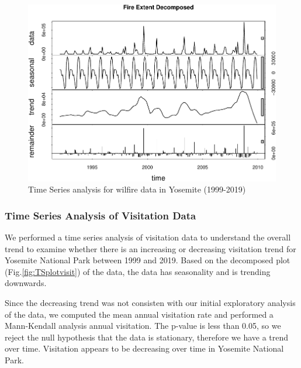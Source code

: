 \documentclass[
  12pt,
]{article}
\begin{document}
\begin{figure}
\centering
\includegraphics{CodeFinal_files/figure-latex/TSplotfire-1.pdf}
\caption{\label{fig:TSplotfire}Time Series analysis for wilfire data in Yosemite (1999-2019)}
\end{figure}

\hypertarget{time-series-analysis-of-visitation-data}{%
\subsubsection{Time Series Analysis of Visitation Data}\label{time-series-analysis-of-visitation-data}}

We performed a time series analysis of visitation data to understand the overall trend to examine whether there is an increasing or decreasing visitation trend for Yosemite National Park between 1999 and 2019. Based on the decomposed plot (Fig.\ref{fig:TSplotvisit}) of the data, the data has seasonality and is trending downwards.

Since the decreasing trend was not consisten with our initial exploratory analysis of the data, we computed the mean annual visitation rate and performed a Mann-Kendall analysis annual visitation. The p-value is less than 0.05, so we reject the null hypothesis that the data is stationary, therefore we have a trend over time. Visitation appears to be decreasing over time in Yosemite National Park.
\end{document}
